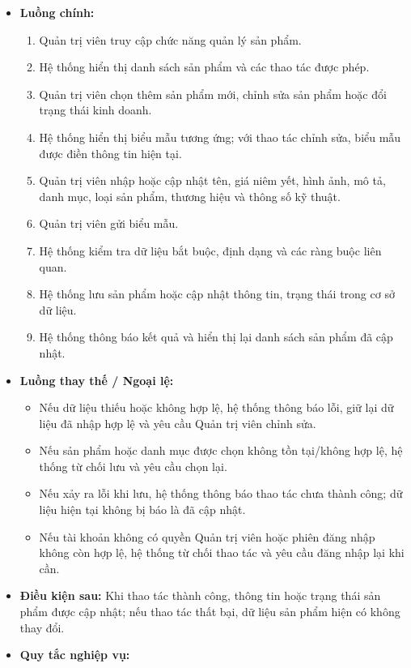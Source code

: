 \documentclass[12pt,a4paper]{article}
\begin{document}
\begin{itemize}
  \item \textbf{Luồng chính:}
  \begin{enumerate}
   \item Quản trị viên truy cập chức năng quản lý sản phẩm.
   \item Hệ thống hiển thị danh sách sản phẩm và các thao tác được phép.
   \item Quản trị viên chọn thêm sản phẩm mới, chỉnh sửa sản phẩm hoặc đổi trạng thái kinh doanh.
   \item Hệ thống hiển thị biểu mẫu tương ứng; với thao tác chỉnh sửa, biểu mẫu được điền thông tin hiện tại.
    \item Quản trị viên nhập hoặc cập nhật tên, giá niêm yết, hình ảnh, mô tả, danh mục, loại sản phẩm, thương hiệu và thông số kỹ thuật.
   \item Quản trị viên gửi biểu mẫu.
   \item Hệ thống kiểm tra dữ liệu bắt buộc, định dạng và các ràng buộc liên quan.
   \item Hệ thống lưu sản phẩm hoặc cập nhật thông tin, trạng thái trong cơ sở dữ liệu.
   \item Hệ thống thông báo kết quả và hiển thị lại danh sách sản phẩm đã cập nhật.
  \end{enumerate}
  \item \textbf{Luồng thay thế / Ngoại lệ:}
  \begin{itemize}
   \item Nếu dữ liệu thiếu hoặc không hợp lệ, hệ thống thông báo lỗi, giữ lại dữ liệu đã nhập hợp lệ và yêu cầu Quản trị viên chỉnh sửa.
   \item Nếu sản phẩm hoặc danh mục được chọn không tồn tại/không hợp lệ, hệ thống từ chối lưu và yêu cầu chọn lại.
   \item Nếu xảy ra lỗi khi lưu, hệ thống thông báo thao tác chưa thành công; dữ liệu hiện tại không bị báo là đã cập nhật.
   \item Nếu tài khoản không có quyền Quản trị viên hoặc phiên đăng nhập không còn hợp lệ, hệ thống từ chối thao tác và yêu cầu đăng nhập lại khi cần.
  \end{itemize}
  \item \textbf{Điều kiện sau:} Khi thao tác thành công, thông tin hoặc trạng thái sản phẩm được cập nhật; nếu thao tác thất bại, dữ liệu sản phẩm hiện có không thay đổi.

 \item \textbf{Quy tắc nghiệp vụ:}

 \begin{itemize}


\end{itemize}
\end{itemize}
\end{document}
